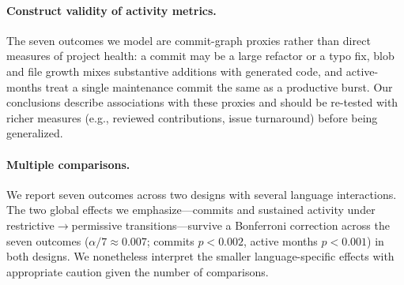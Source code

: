 \paragraph{Construct validity of activity metrics.} The seven outcomes
we model are commit-graph proxies rather than direct measures of project
health: a commit may be a large refactor or a typo fix, blob and file
growth mixes substantive additions with generated code, and active-months
treat a single maintenance commit the same as a productive burst. Our
conclusions describe associations with these proxies and should be
re-tested with richer measures (e.g., reviewed contributions, issue
turnaround) before being generalized.

\paragraph{Multiple comparisons.} We report seven outcomes across two
designs with several language interactions. The two global effects we
emphasize---commits and sustained activity under
restrictive$\rightarrow$permissive transitions---survive a Bonferroni
correction across the seven outcomes ($\alpha/7 \approx 0.007$; commits
$p<0.002$, active months $p<0.001$) in both designs. We nonetheless
interpret the smaller language-specific effects with appropriate caution
given the number of comparisons.
